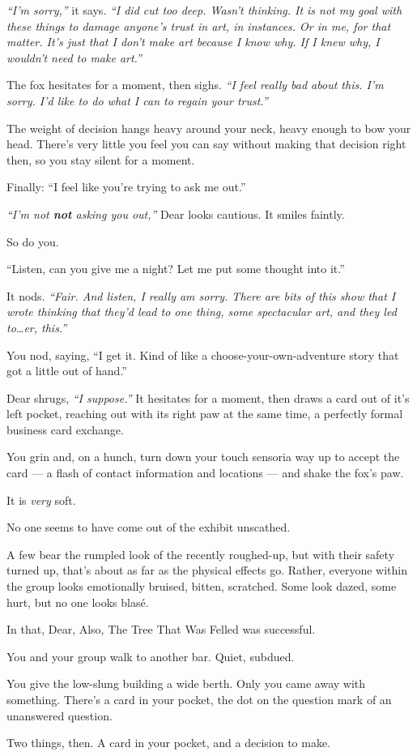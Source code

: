 \emph{``I'm sorry,''} it says. \emph{``I did cut too deep. Wasn't thinking. It is not my goal with these things to damage anyone's trust in art, in instances. Or in me, for that matter. It's just that I don't make art because I know why. If I knew why, I wouldn't need to make art.''}

The fox hesitates for a moment, then sighs. \emph{``I feel really bad about this. I'm sorry. I'd like to do what I can to regain your trust.''}

The weight of decision hangs heavy around your neck, heavy enough to bow your head. There's very little you feel you can say without making that decision right then, so you stay silent for a moment.

Finally: ``I feel like you're trying to ask me out.''

\emph{``I'm not \textbf{not} asking you out,''} Dear looks cautious. It smiles faintly.

So do you.

``Listen, can you give me a night? Let me put some thought into it.''

It nods. \emph{``Fair. And listen, I really am sorry. There are bits of this show that I wrote thinking that they'd lead to one thing, some spectacular art, and they led to\ldots{}er, this.''}

You nod, saying, ``I get it. Kind of like a choose-your-own-adventure story that got a little out of hand.''

Dear shrugs, \emph{``I suppose.''} It hesitates for a moment, then draws a card out of it's left pocket, reaching out with its right paw at the same time, a perfectly formal business card exchange.

You grin and, on a hunch, turn down your touch sensoria way up to accept the card --- a flash of contact information and locations --- and shake the fox's paw.

It is \emph{very} soft.


\newpage

\null
\vfill

No one seems to have come out of the exhibit unscathed.

A few bear the rumpled look of the recently roughed-up, but with their safety turned up, that's about as far as the physical effects go. Rather, everyone within the group looks emotionally bruised, bitten, scratched. Some look dazed, some hurt, but no one looks blasé.

In that, Dear, Also, The Tree That Was Felled was successful.

You and your group walk to another bar. Quiet, subdued.

You give the low-slung building a wide berth. Only you came away with something. There's a card in your pocket, the dot on the question mark of an unanswered question.

Two things, then. A card in your pocket, and a decision to make.

\vfill

